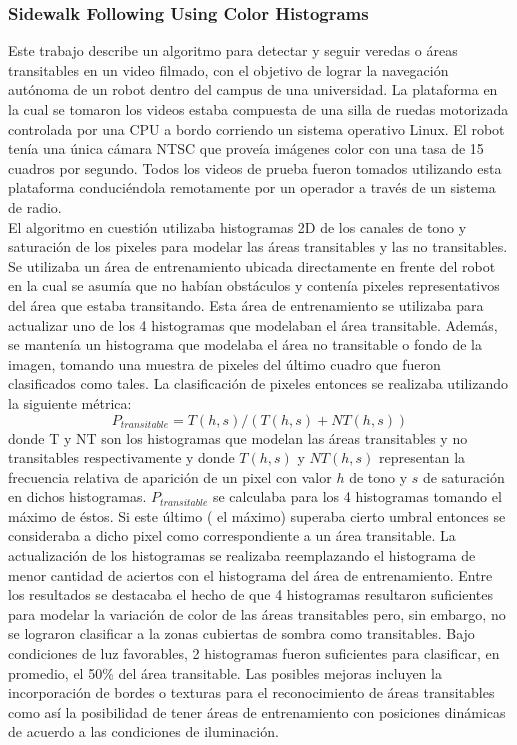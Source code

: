 	\subsubsection{\label{sec:sidewalk} Sidewalk Following Using Color Histograms \cite{sidewalk2008}}
	Este trabajo describe un algoritmo  para detectar y seguir 
	veredas o \'areas transitables en un video filmado, con el objetivo de 
	lograr la navegaci\'on aut\'onoma de un robot dentro del 
	campus de una universidad. La plataforma en la cual se tomaron los 
	videos estaba 
	compuesta de una silla de ruedas motorizada controlada por una CPU 
	a bordo corriendo un sistema operativo Linux. El robot ten\'ia una 
	\'unica c\'amara NTSC que prove\'ia im\'agenes color con una tasa de 15 
	cuadros por segundo. Todos los videos de prueba fueron tomados 
	utilizando esta plataforma conduci\'endola remotamente por un 
	operador a trav\'es de un sistema de radio.\\
	\indent El algoritmo en cuesti\'on utilizaba histogramas 2D de los 
	canales de tono y saturaci\'on de los pixeles para modelar las \'areas
	transitables y las no transitables. Se utilizaba un \'area de  
	entrenamiento ubicada directamente en frente del robot en la cual se 
	asum\'ia que 
	no hab\'ian obst\'aculos y conten\'ia pixeles representativos del \'area que 
	estaba transitando. Esta \'area de entrenamiento se utilizaba para 
	actualizar uno de los 4 histogramas que modelaban el \'area 
	transitable. Adem\'as, se manten\'ia un histograma que modelaba el
	\'area no transitable o fondo de la imagen, tomando una muestra de pixeles del \'ultimo 
	cuadro que fueron clasificados como tales. La 
	clasificaci\'on de pixeles entonces se realizaba utilizando la 
	siguiente m\'etrica:
	\[
	P_{transitable}= T(h,s)/ ( T(h,s) + NT(h,s))
	\]
	donde T y NT son los histogramas que modelan las \'areas transitables
	y no transitables respectivamente y donde $T(h,s)$ y $NT(h,s)$ representan la frecuencia relativa de aparici\'on de un
	pixel con valor $h$ de tono y $s$ de saturaci\'on en dichos histogramas. $P_{transitable}$ se calculaba para 
	los 4 histogramas tomando el m\'aximo de \'estos. Si este \'ultimo ( el 
	m\'aximo) superaba 
	cierto umbral entonces se consideraba a dicho pixel como 
	correspondiente a un \'area transitable.
	La actualizaci\'on de los histogramas se realizaba reemplazando el 
	histograma de menor cantidad de aciertos con el histograma 
	del \'area de entrenamiento.  Entre los resultados se destacaba el 
	hecho de que 4 histogramas resultaron suficientes para modelar la
	variaci\'on de color de las \'areas transitables pero, sin embargo, no 
	se lograron clasificar a la zonas cubiertas de sombra como transitables.
	Bajo condiciones de luz favorables, 2 histogramas fueron 
	suficientes para clasificar, en promedio, el 50\% del \'area 
	transitable. Las posibles mejoras incluyen la incorporaci\'on de 
	bordes o texturas para el reconocimiento de \'areas transitables 
	como as\'i la posibilidad de tener \'areas de entrenamiento con 
	posiciones din\'amicas de acuerdo a las condiciones de iluminaci\'on.
	
